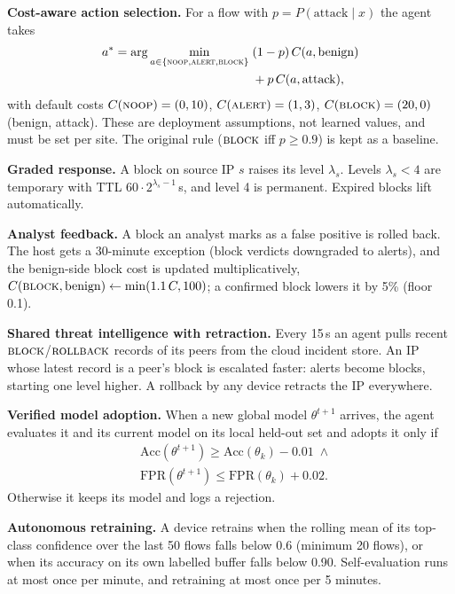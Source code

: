 \textbf{Cost-aware action selection.} For a flow with
$p = P(\text{attack}\mid x)$ the agent takes
\begin{equation}
\begin{aligned}
a^\ast = \arg\min_{a\in\{\textsc{noop},\textsc{alert},\textsc{block}\}}
\;&(1-p)\,C(a,\text{benign})\\
&+ p\,C(a,\text{attack}),
\end{aligned}
\end{equation}
with default costs $C(\textsc{noop})=(0,10)$, $C(\textsc{alert})=(1,3)$,
$C(\textsc{block})=(20,0)$ (benign, attack). These are deployment
assumptions, not learned values, and must be set per site. The
original rule ($\textsc{block}$ iff $p\ge0.9$) is kept as a baseline.

\textbf{Graded response.} A block on source IP $s$ raises its level
$\lambda_s$. Levels $\lambda_s<4$ are temporary with TTL $60\cdot2^{\lambda_s-1}$\,s,
and level 4 is permanent. Expired blocks lift automatically.

\textbf{Analyst feedback.} A block an analyst marks as a false positive is
rolled back. The host gets a 30-minute exception (block verdicts downgraded
to alerts), and the benign-side block cost is updated multiplicatively,
$C(\textsc{block},\text{benign}) \leftarrow \min(1.1\,C, 100)$; a confirmed
block lowers it by 5\% (floor 0.1).

\textbf{Shared threat intelligence with retraction.} Every 15\,s an agent
pulls recent $\textsc{block}$/$\textsc{rollback}$ records of its peers from
the cloud incident store. An IP whose latest record is a peer's block is
escalated faster: alerts become blocks, starting one level higher. A
rollback by any device retracts the IP everywhere.

\textbf{Verified model adoption.} When a new global model $\theta^{t+1}$
arrives, the agent evaluates it and its current model on its local held-out
set and adopts it only if
\begin{equation}
\begin{aligned}
&\mathrm{Acc}(\theta^{t+1}) \ge \mathrm{Acc}(\theta_k) - 0.01 \;\wedge\\
&\mathrm{FPR}(\theta^{t+1}) \le \mathrm{FPR}(\theta_k) + 0.02 .
\end{aligned}
\end{equation}
Otherwise it keeps its model and logs a rejection.

\textbf{Autonomous retraining.} A device retrains when the rolling mean
of its top-class confidence over the last 50 flows falls below 0.6
(minimum 20 flows), or when its accuracy on its own labelled buffer falls
below 0.90. Self-evaluation runs at most once per minute, and retraining at
most once per 5 minutes.

